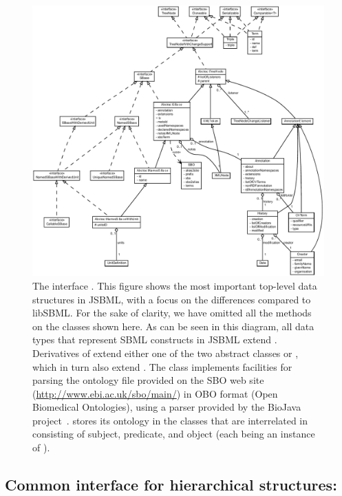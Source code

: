 \begin{figure}[hb]
 \centering
 \vspace*{2ex}
 \includegraphics[width=\textwidth]{../common/img/SBase.pdf}
 \caption[The interface ]{The interface \SBase. This figure
   shows the most important top-level data structures in JSBML, with a
   focus on the differences compared to libSBML. For the sake of clarity,
   we have omitted all the methods on the classes shown here. As can be
   seen in this diagram, all data types that
   represent SBML constructs in JSBML extend \AbstractTreeNode.
   Derivatives of \SBase extend either one of the two abstract
   classes \AbstractSBase or \AbstractNamedSBase, which in turn
   also extend \AbstractTreeNode. The class \SBO implements
   facilities for parsing the ontology file provided on the
   SBO web site (\url{http://www.ebi.ac.uk/sbo/main/}) in OBO format (Open
   Biomedical Ontologies), using a parser provided by the BioJava
   project~\citep{Holland2008}. \SBO stores its ontology in
   the classes  that are interrelated in 
   consisting of subject, predicate, and object (each being an instance of
   ).}
 \label{fig:SBase}
\end{figure}


\subsection{Common interface for hierarchical structures: }%
\label{sec:AbstractTreeNode}

